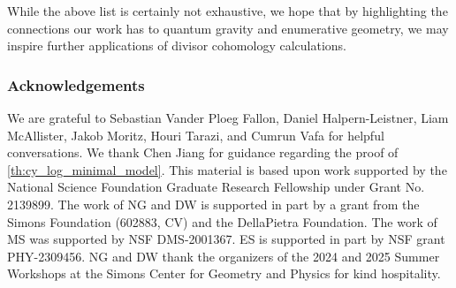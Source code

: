 \documentclass[11pt,dvipsnames]{article}
\theoremstyle{definition}
\begin{document}
\noindent While the above list is certainly not exhaustive, we hope that by highlighting the connections our work has to quantum gravity and enumerative geometry, we may inspire further applications of divisor cohomology calculations.


\subsubsection*{Acknowledgements}

We are grateful to Sebastian Vander Ploeg Fallon, Daniel Halpern-Leistner, Liam McAllister, Jakob Moritz, Houri Tarazi, and Cumrun Vafa for helpful conversations. We thank Chen Jiang for guidance regarding the proof of \cref{th:cy_log_minimal_model}. This material is based upon work supported by the National Science Foundation Graduate Research Fellowship under Grant No. 2139899. The work of NG and DW is supported in part by a grant from the Simons Foundation (602883, CV) and the DellaPietra Foundation. The work of MS was supported by NSF DMS-2001367. ES is supported in part by NSF grant PHY-2309456. NG and DW thank the organizers of the 2024 and 2025 Summer Workshops at the Simons Center for Geometry and Physics for kind hospitality.



\end{document}

